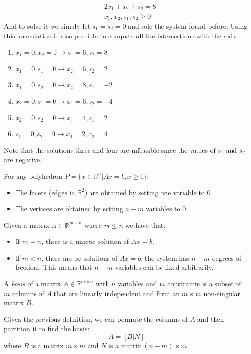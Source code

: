 \documentclass[12pt, a4paper]{report}
\begin{document}
\begin{example}
\begin{align*}
                                        &\: 2x_1+x_2+s_2 = 8  \\
                                        &\: x_1,x_2,s_1,s_2 \geq 0
        \end{align*}
        And to solve it we simply let $s_1=s_2=0$ and sole the system found before. Using this formulation is also possible to compute all the intersections
        with the axis: 
        \begin{enumerate}
            \item $x_1=0,x_2=0 \rightarrow s_1=6,s_2=8$
            \item $x_1=0,s_1=0 \rightarrow x_2=6,s_2=2$
            \item $x_1=0,s_2=0 \rightarrow x_2=8,s_1=-2$
            \item $x_2=0,s_1=0 \rightarrow x_1=6,s_2=-4$
            \item $x_2=0,s_2=0 \rightarrow x_1=4,s_1=2$
            \item $s_1=0,s_2=0 \rightarrow x_1=2,x_2=4$
        \end{enumerate}
        Note that the solutions three and four are infeasible since the values of $s_1$ and $s_2$ are negative. 
    \end{example}
    \begin{property}
        For any polyhedron $P = \{x \in \mathbb{R}^n|Ax = b,x \geq 0\}$:
        \begin{itemize}
            \item The facets (edges in $\mathbb{R}^2$) are obtained by setting one variable to $0$
            \item The vertices are obtained by setting $n-m$ variables to 0. 
        \end{itemize}
    \end{property}
    Given a matrix $A \in \mathbb{R}^{m \times n}$ where $m \leq n$ we have that: 
    \begin{itemize}
        \item If $m=n$, there is a unique solution of $Ax = b$.
        \item If $m<n$, there are $\infty$ solutions of $Ax = b$: the system has $n-m$ degrees of freedom. This means that $n-m$ variables can be fixed arbitrarily. 
    \end{itemize}
    \begin{definition}
        A \emph{basis} of a matrix $A \in \mathbb{R}^{m \times n}$ with $n$ variables and $m$ constraints is a subset of $m$ columns of $A$ that are linearly 
        independent and form an $m \times m$ non-singular matrix $B$. 
    \end{definition}
    Given the previous definition, we can permute the columns of $A$ and then partition it to find the basis: 
    \[A=\left[ B|N \right]\]
    \[\]
    where $B$ is a matrix $m \times m$ and $N$ is a matrix $(n-m) \times m$.
\end{document}
